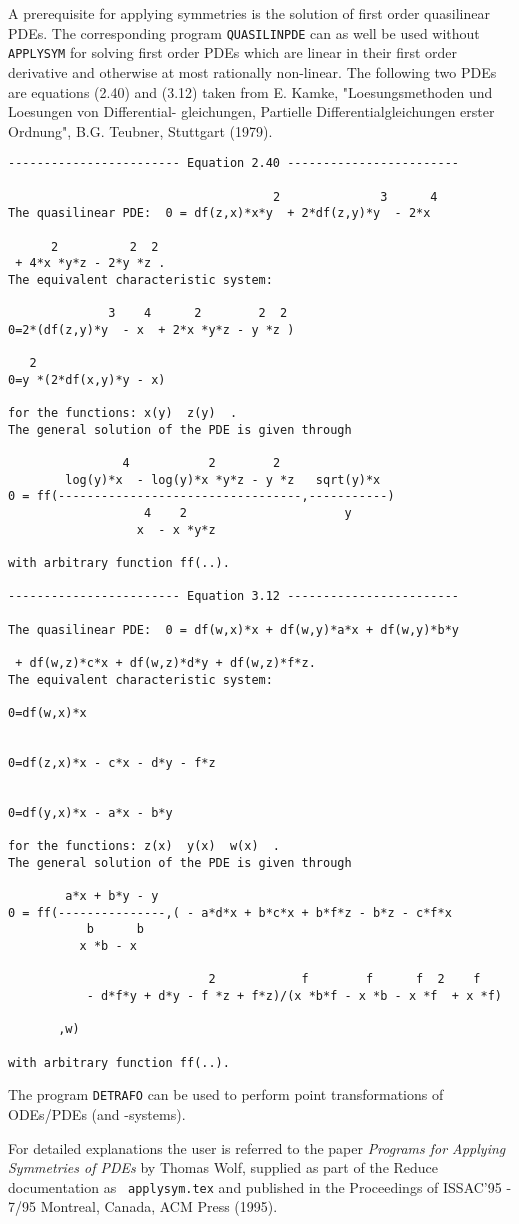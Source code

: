 A prerequisite for applying symmetries is the solution of first order
quasilinear PDEs.  The corresponding program 
{\tt QUASILINPDE} can as well be used without
{\tt APPLYSYM} for solving first order PDEs which are 
linear in their first order derivative and otherwise at most rationally
non-linear.  The following two PDEs are equations (2.40) and (3.12) 
taken from E. Kamke, "Loesungsmethoden und Loesungen von Differential-
gleichungen, Partielle Differentialgleichungen erster Ordnung", 
B.G. Teubner, Stuttgart (1979).
\newpage
{\small
\begin{verbatim}
------------------------ Equation 2.40 ------------------------

                                     2              3      4
The quasilinear PDE:  0 = df(z,x)*x*y  + 2*df(z,y)*y  - 2*x

      2          2  2
 + 4*x *y*z - 2*y *z .
The equivalent characteristic system:

              3    4      2        2  2
0=2*(df(z,y)*y  - x  + 2*x *y*z - y *z )

   2
0=y *(2*df(x,y)*y - x)

for the functions: x(y)  z(y)  .
The general solution of the PDE is given through

                4           2        2
        log(y)*x  - log(y)*x *y*z - y *z   sqrt(y)*x
0 = ff(----------------------------------,-----------)
                   4    2                      y
                  x  - x *y*z

with arbitrary function ff(..).

------------------------ Equation 3.12 ------------------------

The quasilinear PDE:  0 = df(w,x)*x + df(w,y)*a*x + df(w,y)*b*y

 + df(w,z)*c*x + df(w,z)*d*y + df(w,z)*f*z.
The equivalent characteristic system:

0=df(w,x)*x


0=df(z,x)*x - c*x - d*y - f*z


0=df(y,x)*x - a*x - b*y

for the functions: z(x)  y(x)  w(x)  .
The general solution of the PDE is given through

        a*x + b*y - y
0 = ff(---------------,( - a*d*x + b*c*x + b*f*z - b*z - c*f*x
           b      b
          x *b - x

                            2            f        f      f  2    f
           - d*f*y + d*y - f *z + f*z)/(x *b*f - x *b - x *f  + x *f)

       ,w)

with arbitrary function ff(..).
\end{verbatim}
}
The program {\tt DETRAFO} can be used to perform
point transformations of ODEs/PDEs (and -systems).

For detailed explanations the user is
referred to the paper {\em Programs for Applying Symmetries of PDEs}
by Thomas Wolf, supplied as part of the Reduce documentation as {\tt
applysym.tex} and published in the Proceedings of ISSAC'95 - 7/95
Montreal, Canada, ACM Press (1995).

